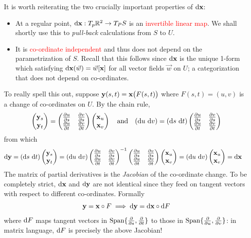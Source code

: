 It is worth reiterating the two crucially important properties of $\dvx$:
\begin{itemize}
  \item At a regular point, $\dvx:T_p\R^2\to T_PS$ is an \textcolor{red}{invertible linear map}. We shall shortly use this to \emph{pull-back} calculations from $S$ to $U$.
  \item It is \textcolor{red}{co-ordinate independent} and thus does not depend on the parametrization of $S$. Recall that this follows since $\dvx$ is the unique 1-form which satisfying $\dvx(\vec w)=\vec w[\vx]$ for all vector fields $\vec w$ on $U$; a categorization that does not depend on co-ordinates.
\end{itemize}


\begin{aside}\label{aside:coc}
\quad To really spell this out, suppose $\vy(s,t)=\vx\bigl(F(s,t)\bigr)$ where $F(s,t)=(u,v)$ is a change of co-ordinates on $U$. By the chain rule,
\[\twovec{\vy_s}{\vy_t}
=\begin{pmatrix}
\partials[u]{s}&\partials[v]{s}\\
\partials[u]{t}&\partials[v]{t}
\end{pmatrix}
\twovec{\vx_u}{\vx_v}\quad\text{and}\quad
(\du\ \dv)=(\ds\ \dt)\begin{pmatrix}
\partials[u]{s}&\partials[v]{s}\\
\partials[u]{t}&\partials[v]{t}
\end{pmatrix}\]
from which
\begin{align*}
\D\vy&=(\ds\ \dt)\twovec{\vy_s}{\vy_t} =(\du\ \dv)\begin{pmatrix}
\partials[u]{s}&\partials[v]{s}\\
\partials[u]{t}&\partials[v]{t}
\end{pmatrix}^{-1}\begin{pmatrix}
\partials[u]{s}&\partials[v]{s}\\
\partials[u]{t}&\partials[v]{t}
\end{pmatrix}
\twovec{\vx_u}{\vx_v} =(\du\ \dv)\twovec{\vx_u}{\vx_v}=\dvx
\end{align*}
The matrix of partial derivatives is the \emph{Jacobian} of the co-ordinate change.\smallbreak
To be completely strict, $\dvx$ and $\D\vy$ are not identical since they feed on tangent vectors with respect to different co-ordinates. Formally
\[\vy=\vx\circ F\implies\D\vy=\dvx\circ\D F\]
where $\D F$ maps tangent vectors in $\Span\{\partials s,\partials t\}$ to those in $\Span\{\partials u,\partials v\}$: in matrix language, $\D F$ is precisely the above Jacobian!
\end{aside}

